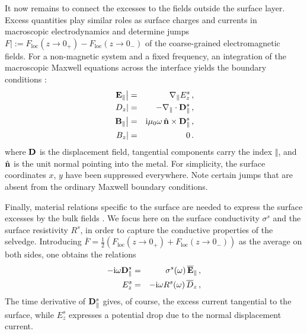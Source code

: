 \documentclass[11pt, oneside]{article}   	%
\def\surconduct{{\sigma^s}}
\def\surresist{{R^s}}
\newcommand*{\excess}[2][]{{#2}_{#1}^s}
\newcommand{\bulk}[1]{_{\mathrm{#1}}}
\begin{document}
It now remains to connect the excesses to the fields outside the
surface layer. 
Excess quantities play similar roles as surface charges and currents in macroscopic
electrodynamics and determine
jumps $\left. F \right| := F\bulk{loc}(z \to 0_+) - F\bulk{loc}(z \to 0_-)$
of the coarse-grained electromagnetic fields. For a non-magnetic system and a fixed
frequency, an integration
of the macroscopic Maxwell equations across the interface yields
the boundary conditions \citep{Bedeaux_2002}:
\begin{eqnarray}
\left. {\bf E}_\parallel \right|  & = & \nabla_\parallel \excess[z]{E} \, , \\
\left. D_z \right|  & = & -  \nabla_\parallel \cdot \excess[\parallel]{\bf D} \, ,\\
\left. {\bf B}_\parallel \right|  & = & {\rm i} \mu_0 \omega \, \hat{\bf n} \times \excess[\parallel]{\bf D} \, ,\\
\left. B_z \right|  & = & 0 \, .
\end{eqnarray}
where ${\bf D}$ is the displacement field, 
tangential components carry the index $\Vert$, and $\hat{\bf n}$ is the unit 
normal pointing into the metal.
For simplicity, the surface coordinates $x$, $y$ have been suppressed everywhere.
Note certain jumps that are absent from the ordinary Maxwell boundary conditions.

Finally, material relations specific to the surface are needed to express the surface excesses
by the bulk fields \citep{Bedeaux_2002}.
We focus here on the surface conductivity $\surconduct{}$ and the surface resistivity 
$\surresist{}$, in order to capture the conductive properties of the selvedge.
Introducing $\overline{F} 
= \frac{1}{2} \left( F\bulk{loc}(z \to 0_+) + F\bulk{loc}(z \to 0_-) \right)$
as the average on both sides, one obtains the relations
\begin{eqnarray}
- {\rm i} \omega {\bf D}_\parallel^s  & = & \surconduct{}(\omega)\, \overline{\bf E}_\parallel  \, , \label{eq:excess-boundary-condition-0}
\\
E^s_z   & = & - {\rm i} \omega \surresist(\omega)\, \overline{D}_z  \, ,
\label{eq:excess-boundary-condition}
\end{eqnarray}
The time derivative of ${\bf D}_\Vert^s$ gives, of course, the excess
current tangential to the surface, while $E^s_z$ expresses a potential drop
due to the normal displacement current. 
\end{document}
